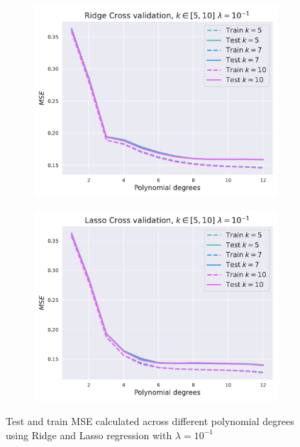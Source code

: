 \documentclass[twocolumn,english,notitlepage]{article}
\begin{document}
        \begin{figure}[ht]
            \begin{subfigure}{\linewidth}
                \centering
                \includegraphics[width=.9\linewidth]{bad_lmbda_Ridge_mse_kfold.pdf}
            \end{subfigure}
            \hfill
            \begin{subfigure}{\linewidth}
                \centering
                \includegraphics[width=.9\linewidth]{bad_lmbda_Lasso_mse_kfold.pdf}
            \end{subfigure}
            \caption{Test and train MSE calculated across different polynomial degrees using Ridge and Lasso regression with $\lambda = 10^{-1}$}
            \label{res:fig:ridgelasso_cv_badlambda}
        \end{figure}
\end{document}
